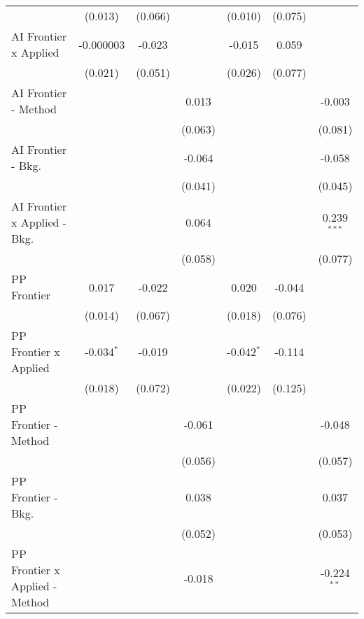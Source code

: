 \begin{tabular}{lcccccc}
                                  & (0.013)      & (0.066) &             & (0.010)      & (0.075) &   \\   
   AI Frontier x Applied          & -0.000003    & -0.023  &             & -0.015       & 0.059   &   \\   
                                  & (0.021)      & (0.051) &             & (0.026)      & (0.077) &   \\   
   AI Frontier - Method           &              &         & 0.013       &              &         & -0.003\\   
                                  &              &         & (0.063)     &              &         & (0.081)\\   
   AI Frontier - Bkg.             &              &         & -0.064      &              &         & -0.058\\   
                                  &              &         & (0.041)     &              &         & (0.045)\\   
   AI Frontier x Applied - Bkg.   &              &         & 0.064       &              &         & 0.239$^{***}$\\   
                                  &              &         & (0.058)     &              &         & (0.077)\\   
   PP Frontier                    & 0.017        & -0.022  &             & 0.020        & -0.044  &   \\   
                                  & (0.014)      & (0.067) &             & (0.018)      & (0.076) &   \\   
   PP Frontier x Applied          & -0.034$^{*}$ & -0.019  &             & -0.042$^{*}$ & -0.114  &   \\   
                                  & (0.018)      & (0.072) &             & (0.022)      & (0.125) &   \\   
   PP Frontier - Method           &              &         & -0.061      &              &         & -0.048\\   
                                  &              &         & (0.056)     &              &         & (0.057)\\   
   PP Frontier - Bkg.             &              &         & 0.038       &              &         & 0.037\\   
                                  &              &         & (0.052)     &              &         & (0.053)\\   
   PP Frontier x Applied - Method &              &         & -0.018      &              &         & -0.224$^{**}$\\   

\end{tabular}
